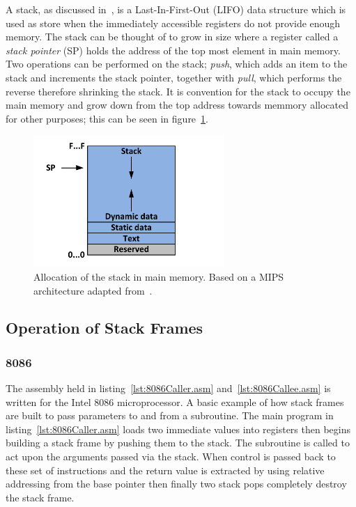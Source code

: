 \documentclass[12pt,a4paper]{article}
\begin{document}



A stack, as discussed in~\cite{stack}, is a Last-In-First-Out (LIFO) data structure which is used as store when the immediately accessible registers do not provide enough memory.
The stack can be thought of to grow in size where a register called a \emph{stack pointer} (SP) holds the address of the top most element in main memory.
Two operations can be performed on the stack; \emph{push}, which adds an item to the stack and increments the stack pointer, together with \emph{pull}, which performs the reverse therefore shrinking the stack. 
It is convention for the stack to occupy the main memory and grow down from the top address towards memmory allocated for other purposes; this can be seen in figure~\ref{fig:allocation}.


\begin{figure}[htb]
   \centering
   \includegraphics[height=5cm]{Figures/allocation.pdf}
   \caption{Allocation of the stack in main memory. Based on a MIPS architecture adapted from~\cite{stack}.}
   \label{fig:allocation}
\end{figure}






\subsection{Operation of Stack Frames}

\subsubsection{8086}
\label{8086}
The assembly held in listing~\ref{lst:8086Caller.asm} and~\ref{lst:8086Callee.asm} is written for the Intel 8086 microprocessor.
A basic example of how stack frames are built to pass parameters to and from a subroutine.
The main program in listing~\ref{lst:8086Caller.asm} loads two immediate values into registers then begins building a stack frame by pushing them to the stack.  
The subroutine is called to act upon the arguments passed via the stack.
When control is passed back to these set of instructions and the return value is extracted by using relative addressing from the base pointer then finally two stack pops completely destroy the stack frame.
\end{document}
